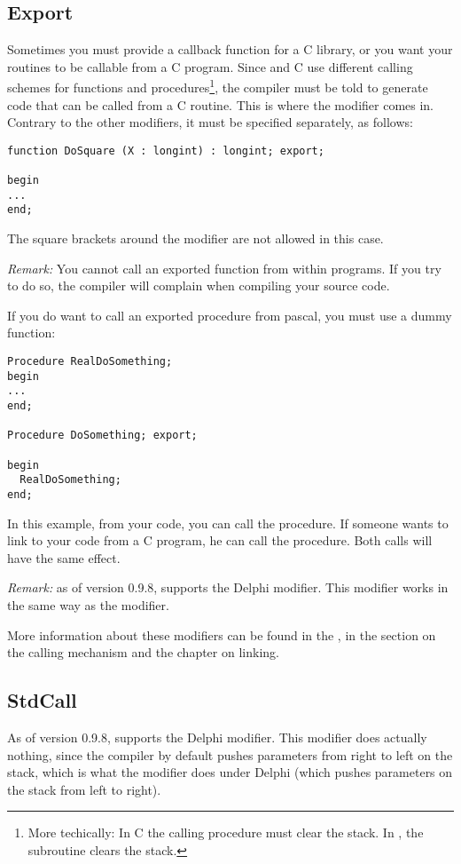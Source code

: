 \documentclass{report}
\begin{document}
\subsection{Export}
Sometimes you must provide a callback function for a C library, or you want
your routines to be callable from a C program. Since \fpc and C use
different calling schemes for functions and procedures\footnote{More
techically: In C the calling procedure must clear the stack. In \fpc, the
subroutine clears the stack.}, the compiler must be told to generate code
that can be called from a C routine. This is where the  modifier
comes in. Contrary to the other modifiers, it must be specified separately,
as follows:
\begin{verbatim}
function DoSquare (X : longint) : longint; export;

begin
...
end;
\end{verbatim} 
The square brackets around the modifier are not allowed in this case.

{\em Remark:} You cannot call an exported function from within \fpc programs.
If you try to do so, the compiler will complain when compiling your source
code.

If you do want to call an exported procedure from pascal, you must use a
dummy function:
\begin{verbatim}
Procedure RealDoSomething;
begin
...
end;

Procedure DoSomething; export;

begin
  RealDoSomething;
end; 
\end{verbatim}
In this example, from your \fpc code, you can call the 
procedure. If someone wants to link to your code from a C program, he can
call the  procedure. Both calls will have the same effect.

{\em Remark:}
as of version 0.9.8, \fpc supports the Delphi  modifier. 
This modifier works in the same way as the  modifier.

More information about these modifiers can be found in the \progref, in the
section on the calling mechanism and the chapter on linking.

\subsection{StdCall}
As of version 0.9.8, \fpc supports the Delphi  modifier.
This modifier does actually nothing, since the \fpc compiler by default 
pushes parameters from right to left on the stack, which is what the 
modifier does under Delphi (which pushes parameters on the stack from left to 
right).
\end{document}
